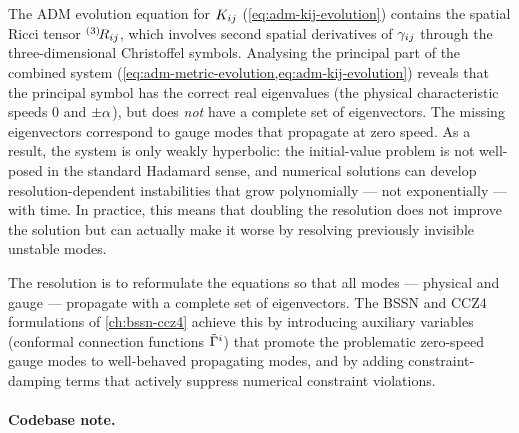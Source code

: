 The ADM evolution equation for $K_{ij}$ (\cref{eq:adm-kij-evolution})
contains the spatial Ricci tensor ${}^{(3)}\!R_{ij}$, which involves second
spatial derivatives of $\gamma_{ij}$ through the three-dimensional
Christoffel symbols.  Analysing the principal part of the combined system
(\cref{eq:adm-metric-evolution,eq:adm-kij-evolution}) reveals that the
principal symbol has the correct real eigenvalues (the physical
characteristic speeds $0$ and $\pm\alpha$), but does \emph{not} have a
complete set of eigenvectors.  The missing eigenvectors correspond to
gauge modes that propagate at zero speed.  As a result, the system is only
weakly hyperbolic: the initial-value problem is not well-posed in the
standard Hadamard sense, and numerical solutions can develop
resolution-dependent instabilities that grow polynomially --- not
exponentially --- with time.  In practice, this means that doubling the
resolution does not improve the solution but can actually make it worse by
resolving previously invisible unstable modes.

The resolution is to reformulate the equations so that all modes ---
physical and gauge --- propagate with a complete set of eigenvectors.  The
BSSN and CCZ4 formulations of \cref{ch:bssn-ccz4} achieve this by
introducing auxiliary variables (conformal connection functions
$\tilde{\Gamma}^{i}$) that promote the problematic zero-speed gauge modes
to well-behaved propagating modes, and by adding constraint-damping terms
that actively suppress numerical constraint violations.

\paragraph{Codebase note.}

